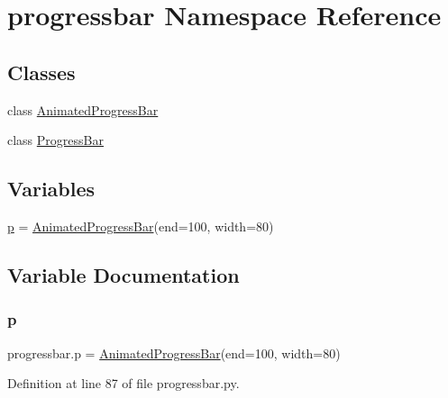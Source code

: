\hypertarget{namespaceprogressbar}{}\section{progressbar Namespace Reference}
\label{namespaceprogressbar}
\subsection*{Classes}
\begin{DoxyCompactItemize}
\item 
class \hyperlink{classprogressbar_1_1AnimatedProgressBar}{Animated\+Progress\+Bar}
\item 
class \hyperlink{classprogressbar_1_1ProgressBar}{Progress\+Bar}
\end{DoxyCompactItemize}
\subsection*{Variables}
\begin{DoxyCompactItemize}
\item 
\hyperlink{namespaceprogressbar_ae52c2f9f5dc12ba745ab6156965df610}{p} = \hyperlink{classprogressbar_1_1AnimatedProgressBar}{Animated\+Progress\+Bar}(end=100, width=80)
\end{DoxyCompactItemize}


\subsection{Variable Documentation}
\mbox{\label{namespaceprogressbar_ae52c2f9f5dc12ba745ab6156965df610}} 
\subsubsection{\texorpdfstring{p}{p}}
{\footnotesize\ttfamily progressbar.\+p = \hyperlink{classprogressbar_1_1AnimatedProgressBar}{Animated\+Progress\+Bar}(end=100, width=80)}



Definition at line 87 of file progressbar.\+py.


